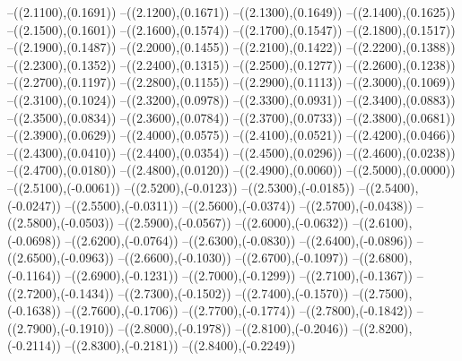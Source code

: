 {	--({\sx*(2.1100)},{\sy*(0.1691)})
	--({\sx*(2.1200)},{\sy*(0.1671)})
	--({\sx*(2.1300)},{\sy*(0.1649)})
	--({\sx*(2.1400)},{\sy*(0.1625)})
	--({\sx*(2.1500)},{\sy*(0.1601)})
	--({\sx*(2.1600)},{\sy*(0.1574)})
	--({\sx*(2.1700)},{\sy*(0.1547)})
	--({\sx*(2.1800)},{\sy*(0.1517)})
	--({\sx*(2.1900)},{\sy*(0.1487)})
	--({\sx*(2.2000)},{\sy*(0.1455)})
	--({\sx*(2.2100)},{\sy*(0.1422)})
	--({\sx*(2.2200)},{\sy*(0.1388)})
	--({\sx*(2.2300)},{\sy*(0.1352)})
	--({\sx*(2.2400)},{\sy*(0.1315)})
	--({\sx*(2.2500)},{\sy*(0.1277)})
	--({\sx*(2.2600)},{\sy*(0.1238)})
	--({\sx*(2.2700)},{\sy*(0.1197)})
	--({\sx*(2.2800)},{\sy*(0.1155)})
	--({\sx*(2.2900)},{\sy*(0.1113)})
	--({\sx*(2.3000)},{\sy*(0.1069)})
	--({\sx*(2.3100)},{\sy*(0.1024)})
	--({\sx*(2.3200)},{\sy*(0.0978)})
	--({\sx*(2.3300)},{\sy*(0.0931)})
	--({\sx*(2.3400)},{\sy*(0.0883)})
	--({\sx*(2.3500)},{\sy*(0.0834)})
	--({\sx*(2.3600)},{\sy*(0.0784)})
	--({\sx*(2.3700)},{\sy*(0.0733)})
	--({\sx*(2.3800)},{\sy*(0.0681)})
	--({\sx*(2.3900)},{\sy*(0.0629)})
	--({\sx*(2.4000)},{\sy*(0.0575)})
	--({\sx*(2.4100)},{\sy*(0.0521)})
	--({\sx*(2.4200)},{\sy*(0.0466)})
	--({\sx*(2.4300)},{\sy*(0.0410)})
	--({\sx*(2.4400)},{\sy*(0.0354)})
	--({\sx*(2.4500)},{\sy*(0.0296)})
	--({\sx*(2.4600)},{\sy*(0.0238)})
	--({\sx*(2.4700)},{\sy*(0.0180)})
	--({\sx*(2.4800)},{\sy*(0.0120)})
	--({\sx*(2.4900)},{\sy*(0.0060)})
	--({\sx*(2.5000)},{\sy*(0.0000)})
	--({\sx*(2.5100)},{\sy*(-0.0061)})
	--({\sx*(2.5200)},{\sy*(-0.0123)})
	--({\sx*(2.5300)},{\sy*(-0.0185)})
	--({\sx*(2.5400)},{\sy*(-0.0247)})
	--({\sx*(2.5500)},{\sy*(-0.0311)})
	--({\sx*(2.5600)},{\sy*(-0.0374)})
	--({\sx*(2.5700)},{\sy*(-0.0438)})
	--({\sx*(2.5800)},{\sy*(-0.0503)})
	--({\sx*(2.5900)},{\sy*(-0.0567)})
	--({\sx*(2.6000)},{\sy*(-0.0632)})
	--({\sx*(2.6100)},{\sy*(-0.0698)})
	--({\sx*(2.6200)},{\sy*(-0.0764)})
	--({\sx*(2.6300)},{\sy*(-0.0830)})
	--({\sx*(2.6400)},{\sy*(-0.0896)})
	--({\sx*(2.6500)},{\sy*(-0.0963)})
	--({\sx*(2.6600)},{\sy*(-0.1030)})
	--({\sx*(2.6700)},{\sy*(-0.1097)})
	--({\sx*(2.6800)},{\sy*(-0.1164)})
	--({\sx*(2.6900)},{\sy*(-0.1231)})
	--({\sx*(2.7000)},{\sy*(-0.1299)})
	--({\sx*(2.7100)},{\sy*(-0.1367)})
	--({\sx*(2.7200)},{\sy*(-0.1434)})
	--({\sx*(2.7300)},{\sy*(-0.1502)})
	--({\sx*(2.7400)},{\sy*(-0.1570)})
	--({\sx*(2.7500)},{\sy*(-0.1638)})
	--({\sx*(2.7600)},{\sy*(-0.1706)})
	--({\sx*(2.7700)},{\sy*(-0.1774)})
	--({\sx*(2.7800)},{\sy*(-0.1842)})
	--({\sx*(2.7900)},{\sy*(-0.1910)})
	--({\sx*(2.8000)},{\sy*(-0.1978)})
	--({\sx*(2.8100)},{\sy*(-0.2046)})
	--({\sx*(2.8200)},{\sy*(-0.2114)})
	--({\sx*(2.8300)},{\sy*(-0.2181)})
	--({\sx*(2.8400)},{\sy*(-0.2249)})
}
